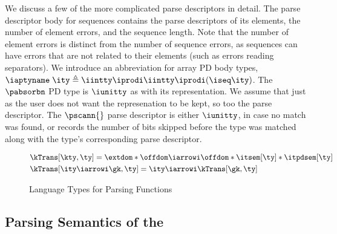 We discuss a few of the more complicated parse descriptors in detail.
The parse descriptor body for sequences contains the parse descriptors of its elements,
the number of element errors, and the sequence length. Note that the
number of element errors is distinct from the number of sequence
errors, as sequences can have errors that are not related to their
elements (such as errors reading separators).  We introduce an
abbreviation for array PD body types, $\iaptyname \; \ity \triangleq
\iintty \iprodi \iintty \iprodi (\iseq \ity)$.
The $\pabsorbn$ PD
type is $\iunitty$ as with its representation. We assume that just as
the user does not want the represenation to be kept, so too the parse
descriptor.  The $\pscann{}$ parse descriptor is either $\iunitty$, in case
no match was found, or records the number of bits skipped before the
type was matched along with the type's corresponding parse descriptor.


\begin{figure}
\small
\fbox{$\kTrans[\gk,\ty] = \ity$} 
    
\begin{align*}
  &\kTrans[\kty,\ty] = \extdom * \offdom \iarrowi \offdom * \itsem[\ty] * \itpdsem[\ty]
   \\
   &\kTrans[\ity \iarrowi \gk,\ty] = \ity \iarrowi \kTrans[\gk,\ty]
\end{align*}  
  \caption{\Implang{} Language Types for Parsing Functions}
  \label{fig:parser-types}
\end{figure}

\subsection{Parsing Semantics of the \ddc{}}
\label{sec:parse-sem}

